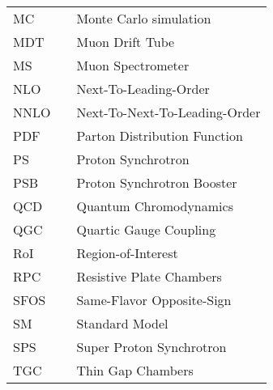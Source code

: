   \begin{tabular}{lp{}p{}}
    MC          & \dotfill & Monte Carlo simulation \\
    MDT         & \dotfill & Muon Drift Tube \\
    MS          & \dotfill & Muon Spectrometer \\
    NLO         & \dotfill & Next-To-Leading-Order \\
    NNLO         & \dotfill & Next-To-Next-To-Leading-Order \\
    PDF         & \dotfill & Parton Distribution Function \\
    PS          & \dotfill & Proton Synchrotron \\
    PSB         & \dotfill & Proton Synchrotron Booster \\
    QCD         & \dotfill & Quantum Chromodynamics \\
    QGC         & \dotfill & Quartic Gauge Coupling \\
    RoI         & \dotfill & Region-of-Interest \\
    RPC         & \dotfill & Resistive Plate Chambers \\
    SFOS        & \dotfill & Same-Flavor Opposite-Sign \\
    SM          & \dotfill & Standard Model  \\
    SPS         & \dotfill & Super Proton Synchrotron \\
    TGC         & \dotfill & Thin Gap Chambers \\

  \end{tabular}


